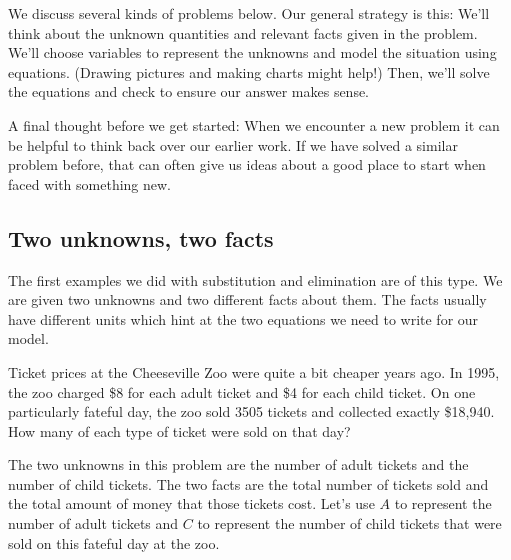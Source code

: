 We discuss several kinds of problems below. Our general strategy is this: We'll think about the unknown quantities and relevant facts given in the problem. We'll choose variables to represent the unknowns and model the situation using equations. (Drawing pictures and making charts might help!) Then, we'll solve the equations and check to ensure our answer makes sense.

A final thought before we get started: When we encounter a new problem it can be helpful to think back over our earlier work. If we have solved a similar problem before, that can often give us ideas about a good place to start when faced with something new.

\subsection{Two unknowns, two facts}

The first examples we did with substitution and elimination are of this type. We are given two unknowns and two different facts about them. The facts usually have different units which hint at the two equations we need to write for our model.



\begin{boxex}
Ticket prices at the Cheeseville Zoo were quite a bit cheaper years ago. In 1995, the zoo charged \$8 for each adult ticket and \$4 for each child ticket. On one particularly fateful day, the zoo sold 3505 tickets and collected exactly \$18,940. How many of each type of ticket were sold on that day?
\end{boxex}

The two unknowns in this problem are the number of adult tickets and the number of child tickets. The two facts are the total number of tickets sold and the total amount of money that those tickets cost. Let's use $A$ to represent the number of adult tickets and $C$ to represent the number of child tickets that were sold on this fateful day at the zoo.


